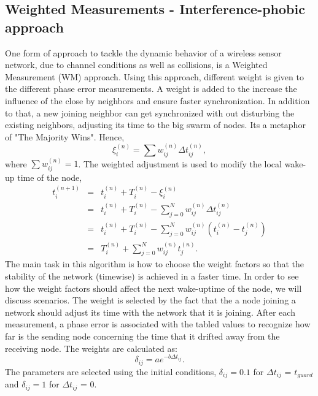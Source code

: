 \documentclass[a4paper,10pt]{report}
\begin{document}
\subsection{\textbf{Weighted Measurements - Interference-phobic approach}}
One form of approach to tackle the dynamic behavior of a wireless sensor network, due to channel conditions as well as collisions, is a
Weighted Measurement (WM) approach. Using this approach, different weight is given to the different phase error measurements. A weight is added to the increase the influence of the close by neighbors and ensure faster synchronization. In addition to that, a new joining neighbor can get synchronized with out disturbing the existing neighbors, adjusting its time to the big swarm of nodes. Its a metaphor of "The Majority Wins". Hence,
\begin{equation}
\xi_i^{(n)} = \sum{w_{ij}^{(n)}\Delta t_{ij}^{(n)}} ,
\end{equation}
where $\sum{w_{ij}^{(n)}= 1}$.
\newline
The weighted adjustment is used to modify the local wake-up time of the node,
\begin{eqnarray*}
t_i^{(n+1)} &=& t_i^{(n)} + T_i^{(n)} - \xi_i^{(n)} \\ &=& t_i^{(n)}
+ T_i^{(n)} - \sum_{j=0}^N{w_{ij}^{(n)}\Delta t_{ij}^{(n)}} \\ &=&
t_i^{(n)}+ T_i^{(n)} -
\sum_{j=0}^N{w_{ij}^{(n)}(t_i^{(n)}-t_j^{(n)})} \\ &=& T_i^{(n)} + \sum_{j=0}^N{w_{ij}^{(n)}t_j^{(n)}}.
\end{eqnarray*}
\newline
The main task in this algorithm is how to choose the weight factors so that the stability of the network (timewise) is achieved in a faster time. In order to see how the weight factors should affect the next wake-uptime of the node, we will discuss scenarios.
\newline
The weight is selected by the fact that the a node joining a network should adjust its time with the network that it is joining. After
each measurement, a phase error is associated with the tabled values to recognize how far is the sending node concerning the time that it
drifted away from the receiving node. The weights are calculated as:
\begin{equation}
\delta_{ij} = ae^{-b\Delta t_{ij}}.
\end{equation}
The parameters are selected using the initial conditions, $\delta_{ij}=0.1$ for $\Delta t_{ij}$ = $t_{guard}$ and $\delta_{ij}=1$ for $\Delta t_{ij}$ = 0.
\end{document}
